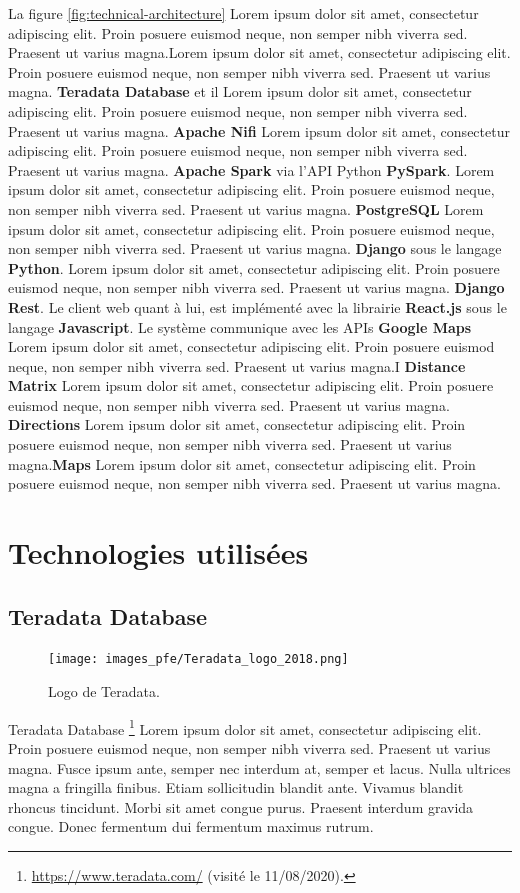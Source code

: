 La figure \ref{fig:technical-architecture} Lorem ipsum dolor sit amet, consectetur adipiscing elit. Proin posuere euismod neque, non semper nibh viverra sed. Praesent ut varius magna.Lorem ipsum dolor sit amet, consectetur adipiscing elit. Proin posuere euismod neque, non semper nibh viverra sed. Praesent ut varius magna. \textbf{Teradata Database} et il Lorem ipsum dolor sit amet, consectetur adipiscing elit. Proin posuere euismod neque, non semper nibh viverra sed. Praesent ut varius magna. \textbf{Apache Nifi} Lorem ipsum dolor sit amet, consectetur adipiscing elit. Proin posuere euismod neque, non semper nibh viverra sed. Praesent ut varius magna. \textbf{Apache Spark} via l'API Python \textbf{PySpark}. Lorem ipsum dolor sit amet, consectetur adipiscing elit. Proin posuere euismod neque, non semper nibh viverra sed. Praesent ut varius magna. \textbf{PostgreSQL} Lorem ipsum dolor sit amet, consectetur adipiscing elit. Proin posuere euismod neque, non semper nibh viverra sed. Praesent ut varius magna. \textbf{Django} sous le langage \textbf{Python}. Lorem ipsum dolor sit amet, consectetur adipiscing elit. Proin posuere euismod neque, non semper nibh viverra sed. Praesent ut varius magna. \textbf{Django Rest}. Le client web quant à lui, est implémenté avec la librairie \textbf{React.js} sous le langage \textbf{Javascript}. Le système communique avec les APIs \textbf{Google Maps} Lorem ipsum dolor sit amet, consectetur adipiscing elit. Proin posuere euismod neque, non semper nibh viverra sed. Praesent ut varius magna.I \textbf{Distance Matrix} Lorem ipsum dolor sit amet, consectetur adipiscing elit. Proin posuere euismod neque, non semper nibh viverra sed. Praesent ut varius magna. \textbf{Directions} Lorem ipsum dolor sit amet, consectetur adipiscing elit. Proin posuere euismod neque, non semper nibh viverra sed. Praesent ut varius magna.\textbf{Maps} Lorem ipsum dolor sit amet, consectetur adipiscing elit. Proin posuere euismod neque, non semper nibh viverra sed. Praesent ut varius magna.

\section{Technologies utilisées}

\subsection*{Teradata Database}

\begin{figure}
  \centering
  \texttt{[image: images\_pfe/Teradata\_logo\_2018.png]}
  \caption{Logo de Teradata.}
\end{figure}
\FloatBarrier
Teradata Database \footnote{\url{https://www.teradata.com/} (visité le 11/08/2020).} Lorem ipsum dolor sit amet, consectetur adipiscing elit. Proin posuere euismod neque, non semper nibh viverra sed. Praesent ut varius magna. Fusce ipsum ante, semper nec interdum at, semper et lacus. Nulla ultrices magna a fringilla finibus. Etiam sollicitudin blandit ante. Vivamus blandit rhoncus tincidunt. Morbi sit amet congue purus. Praesent interdum gravida congue. Donec fermentum dui fermentum maximus rutrum.

